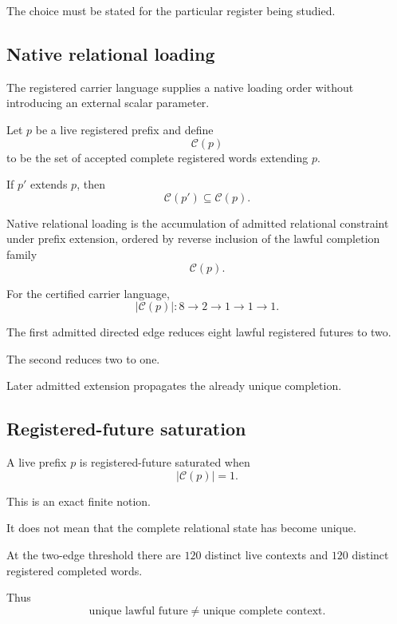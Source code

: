 The choice must be stated for the particular register being studied.

\subsection{Native relational loading}

The registered carrier language supplies a native loading order
without introducing an external scalar parameter.

Let \(p\) be a live registered prefix and define
\[
\mathcal C(p)
\]
to be the set of accepted complete registered words extending \(p\).

If \(p'\) extends \(p\), then
\[
\mathcal C(p')\subseteq\mathcal C(p).
\]

\begin{definition}
Native relational loading is the accumulation of admitted relational
constraint under prefix extension, ordered by reverse inclusion of
the lawful completion family
\[
\mathcal C(p).
\]
\end{definition}

For the certified carrier language,
\[
|\mathcal C(p)|
:
8\longrightarrow2\longrightarrow1
\longrightarrow1\longrightarrow1.
\]

The first admitted directed edge reduces eight lawful registered
futures to two.

The second reduces two to one.

Later admitted extension propagates the already unique completion.

\subsection{Registered-future saturation}

\begin{definition}
A live prefix \(p\) is registered-future saturated when
\[
|\mathcal C(p)|=1.
\]
\end{definition}

This is an exact finite notion.

It does not mean that the complete relational state has become
unique.

At the two-edge threshold there are \(120\) distinct live contexts
and \(120\) distinct registered completed words.

Thus
\[
\text{unique lawful future}
\neq
\text{unique complete context}.
\]

